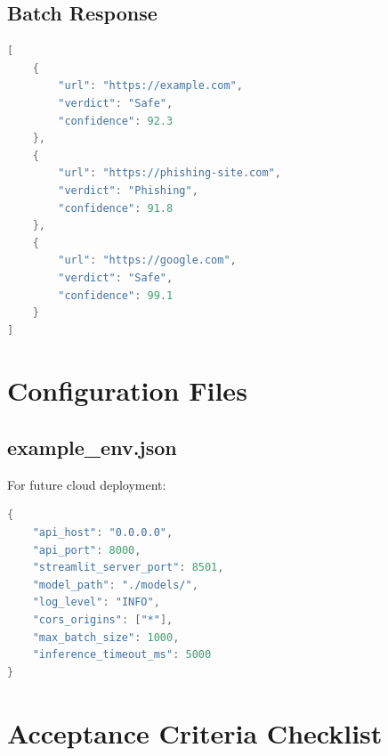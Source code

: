 \documentclass[12pt,a4paper]{report}
\begin{document}
\section{Batch Response}

\begin{lstlisting}[language=java]
[
    {
        "url": "https://example.com",
        "verdict": "Safe",
        "confidence": 92.3
    },
    {
        "url": "https://phishing-site.com",
        "verdict": "Phishing",
        "confidence": 91.8
    },
    {
        "url": "https://google.com",
        "verdict": "Safe",
        "confidence": 99.1
    }
]
\end{lstlisting}

\chapter{Configuration Files}

\section{example\_env.json}

For future cloud deployment:

\begin{lstlisting}[language=java]
{
    "api_host": "0.0.0.0",
    "api_port": 8000,
    "streamlit_server_port": 8501,
    "model_path": "./models/",
    "log_level": "INFO",
    "cors_origins": ["*"],
    "max_batch_size": 1000,
    "inference_timeout_ms": 5000
}
\end{lstlisting}

\chapter{Acceptance Criteria Checklist}
\end{document}
